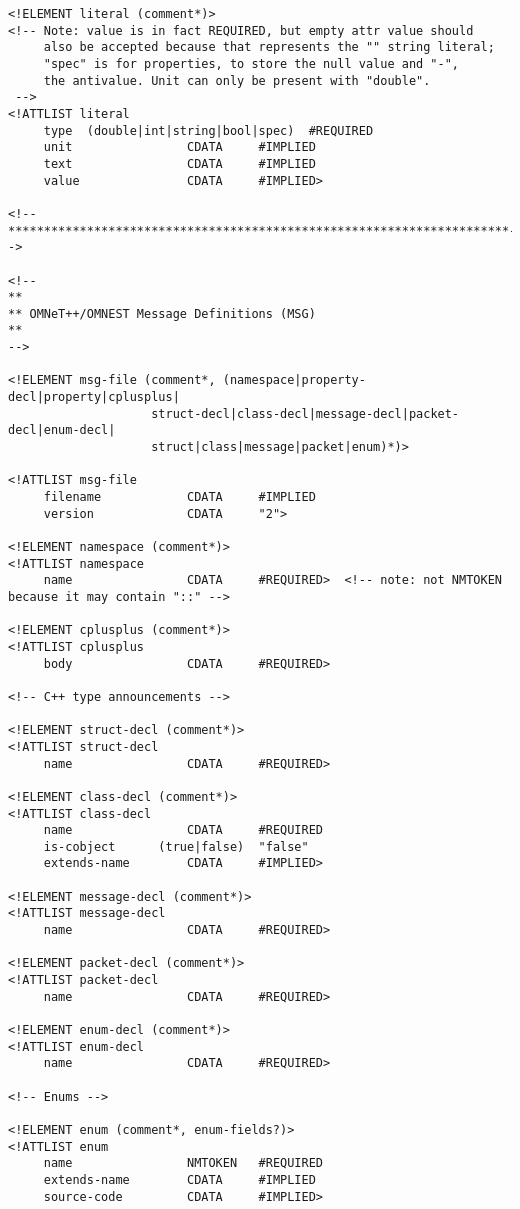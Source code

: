 \begin{verbatim}
<!ELEMENT literal (comment*)>
<!-- Note: value is in fact REQUIRED, but empty attr value should
     also be accepted because that represents the "" string literal;
     "spec" is for properties, to store the null value and "-",
     the antivalue. Unit can only be present with "double".
 -->
<!ATTLIST literal
     type  (double|int|string|bool|spec)  #REQUIRED
     unit                CDATA     #IMPLIED
     text                CDATA     #IMPLIED
     value               CDATA     #IMPLIED>

<!--**********************************************************************-->

<!--
**
** OMNeT++/OMNEST Message Definitions (MSG)
**
-->

<!ELEMENT msg-file (comment*, (namespace|property-decl|property|cplusplus|
                    struct-decl|class-decl|message-decl|packet-decl|enum-decl|
                    struct|class|message|packet|enum)*)>

<!ATTLIST msg-file
     filename            CDATA     #IMPLIED
     version             CDATA     "2">

<!ELEMENT namespace (comment*)>
<!ATTLIST namespace
     name                CDATA     #REQUIRED>  <!-- note: not NMTOKEN because it may contain "::" -->

<!ELEMENT cplusplus (comment*)>
<!ATTLIST cplusplus
     body                CDATA     #REQUIRED>

<!-- C++ type announcements -->

<!ELEMENT struct-decl (comment*)>
<!ATTLIST struct-decl
     name                CDATA     #REQUIRED>

<!ELEMENT class-decl (comment*)>
<!ATTLIST class-decl
     name                CDATA     #REQUIRED
     is-cobject      (true|false)  "false"
     extends-name        CDATA     #IMPLIED>

<!ELEMENT message-decl (comment*)>
<!ATTLIST message-decl
     name                CDATA     #REQUIRED>

<!ELEMENT packet-decl (comment*)>
<!ATTLIST packet-decl
     name                CDATA     #REQUIRED>

<!ELEMENT enum-decl (comment*)>
<!ATTLIST enum-decl
     name                CDATA     #REQUIRED>

<!-- Enums -->

<!ELEMENT enum (comment*, enum-fields?)>
<!ATTLIST enum
     name                NMTOKEN   #REQUIRED
     extends-name        CDATA     #IMPLIED
     source-code         CDATA     #IMPLIED>


\end{verbatim}
